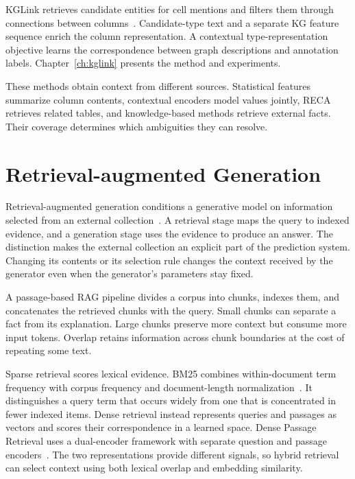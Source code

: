 KGLink retrieves candidate entities for cell mentions and filters them through connections between columns~\cite{bg-kglink}. Candidate-type text and a separate KG feature sequence enrich the column representation. A contextual type-representation objective learns the correspondence between graph descriptions and annotation labels. Chapter~\ref{ch:kglink} presents the method and experiments.

These methods obtain context from different sources. Statistical features summarize column contents, contextual encoders model values jointly, RECA retrieves related tables, and knowledge-based methods retrieve external facts. Their coverage determines which ambiguities they can resolve.

\section{Retrieval-augmented Generation}
\label{sec:background:rag}

Retrieval-augmented generation conditions a generative model on information selected from an external collection~\cite{bg-rag}. A retrieval stage maps the query to indexed evidence, and a generation stage uses the evidence to produce an answer. The distinction makes the external collection an explicit part of the prediction system. Changing its contents or its selection rule changes the context received by the generator even when the generator's parameters stay fixed.

A passage-based RAG pipeline divides a corpus into chunks, indexes them, and concatenates the retrieved chunks with the query. Small chunks can separate a fact from its explanation. Large chunks preserve more context but consume more input tokens. Overlap retains information across chunk boundaries at the cost of repeating some text.

Sparse retrieval scores lexical evidence. BM25 combines within-document term frequency with corpus frequency and document-length normalization~\cite{bg-bm25}. It distinguishes a query term that occurs widely from one that is concentrated in fewer indexed items. Dense retrieval instead represents queries and passages as vectors and scores their correspondence in a learned space. Dense Passage Retrieval uses a dual-encoder framework with separate question and passage encoders~\cite{bg-dpr}. The two representations provide different signals, so hybrid retrieval can select context using both lexical overlap and embedding similarity.

